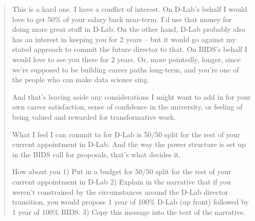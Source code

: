 \begin{quote}
This is a hard one. I have a conflict of interest. On D-Lab's behalf I would
love to get 50\% of your salary back near-term. I'd use that money for doing more
great stuff in D-Lab. On the other hand, D-Lab probably also has an interest in
keeping you for 2 years -- but it would go against my stated approach to commit
the future director to that. On BIDS's behalf I would love to see you there for
2 years. Or, more pointedly, longer, since we're supposed to be building career
paths long-term, and you're one of the people who can make data science sing.

And that's leaving aside any considerations I might want to add in for your own
career satisfaction, sense of confidence in the university, or feeling of being
valued and rewarded for transformative work.

What I feel I can commit to for D-Lab is 50/50 split for the rest of your
current appointment in D-Lab. And the way the  power structure is set up in the
BIDS call for proposals, that's what decides it.

How about you 1) Put in a budget for 50/50 split for the rest of your current
appointment in D-Lab 2) Explain in the narrative that if you weren't constrained
by the circumstances around the D-Lab director transition, you would propose 1
year of 100\% D-Lab (up front) followed by 1 year of 100\% BIDS.  3) Copy this
message into the text of the narrative.
\end{quote}



